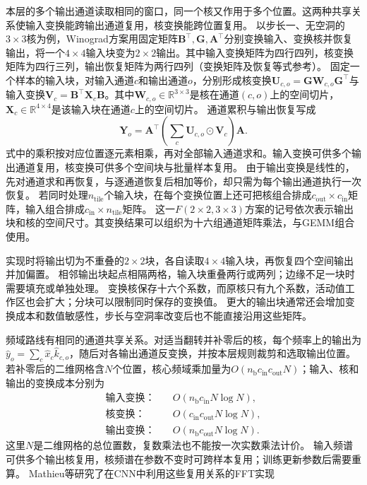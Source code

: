 本层的多个输出通道读取相同的窗口，同一个核又作用于多个位置。这两种共享关系使输入变换能跨输出通道复用，核变换能跨位置复用。
以步长一、无空洞的$3\times3$核为例，Winograd方案用固定矩阵$\bm B^\top,\bm G,\bm A^\top$分别变换输入、变换核并恢复输出，将一个$4\times4$输入块变为$2\times2$输出。其中输入变换矩阵为四行四列，核变换矩阵为四行三列，输出恢复矩阵为两行四列（变换矩阵及恢复等式参考）。
固定一个样本的输入块，对输入通道$c$和输出通道$o$，分别形成核变换$\bm U_{c,o}=\bm G\bm W_{c,o}\bm G^\top$与输入变换$\bm V_c=\bm B^\top\bm X_c\bm B$。其中$\bm W_{c,o}\in\mathbb R^{3\times3}$是核在通道$(c,o)$上的空间切片，$\bm X_c\in\mathbb R^{4\times4}$是该输入块在通道$c$上的空间切片。
通道累积与输出恢复写成
\begin{equation}
 \bm Y_o=\bm A^\top\left(\sum_c\bm U_{c,o}\odot\bm V_c\right)\bm A.
 \label{eq:cnn-winograd-channel-reuse}
\end{equation}
式中的乘积按对应位置逐元素相乘，再对全部输入通道求和。输入变换可供多个输出通道复用，核变换可供多个空间块与批量样本复用。
由于输出变换是线性的，先对通道求和再恢复，与逐通道恢复后相加等价，却只需为每个输出通道执行一次恢复。
若同时处理$n_{\mathrm{tile}}$个输入块，在每个变换位置上还可把核组合排成$c_{\mathrm{out}}\times c_{\mathrm{in}}$矩阵，输入组合排成$c_{\mathrm{in}}\times n_{\mathrm{tile}}$矩阵。
这一$F(2\times2,3\times3)$方案的记号依次表示输出块和核的空间尺寸。其变换结果可以组织为十六组通道矩阵乘法，与GEMM组合使用。

实现时将输出切为不重叠的$2\times2$块，各自读取$4\times4$输入块，再恢复四个空间输出并加偏置。
相邻输出块起点相隔两格，输入块重叠两行或两列；边缘不足一块时需要填充或单独处理。
变换核保存十六个系数，而原核只有九个系数，活动值工作区也会扩大；分块可以限制同时保存的变换值。
更大的输出块通常还会增加变换成本和数值敏感性，步长与空洞率改变后也不能直接沿用这些矩阵。

频域路线有相同的通道共享关系。对适当翻转并补零后的核，每个频率上的输出为$\widehat y_o=\sum_c\widehat x_c\widehat k_{c,o}$，随后对各输出通道反变换，并按本层规则裁剪和选取输出位置。
若补零后的二维网格含$N$个位置，核心频域乘加量为$O(n_{\mathrm b}c_{\mathrm{in}}c_{\mathrm{out}}N)$；输入、核和输出的变换成本分别为
\begin{align*}
 \text{输入变换：}\quad &O(n_{\mathrm b}c_{\mathrm{in}}N\log N),\\
 \text{核变换：}\quad &O(c_{\mathrm{in}}c_{\mathrm{out}}N\log N),\\
 \text{输出变换：}\quad &O(n_{\mathrm b}c_{\mathrm{out}}N\log N).
\end{align*}
这里$N$是二维网格的总位置数，复数乘法也不能按一次实数乘法计价。
输入频谱可供多个输出核复用，核频谱在参数不变时可跨样本复用；训练更新参数后需要重算。
Mathieu等研究了在CNN中利用这些复用关系的FFT实现

